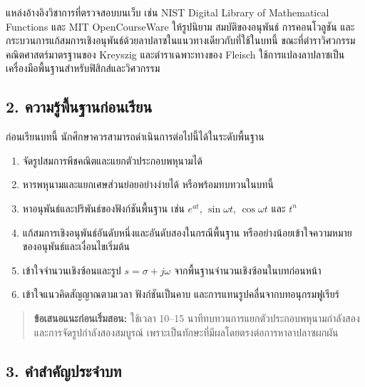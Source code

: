 แหล่งอ้างอิงวิชาการที่ตรวจสอบบนเว็บ เช่น NIST Digital Library of Mathematical Functions และ MIT OpenCourseWare ให้รูปนิยาม สมบัติของอนุพันธ์ การคอนโวลูชัน และกระบวนการแก้สมการเชิงอนุพันธ์ด้วยลาปลาซในแนวทางเดียวกับที่ใช้ในบทนี้ ขณะที่ตำราวิศวกรรมคณิตศาสตร์มาตรฐานของ Kreyszig และตำราเฉพาะทางของ Fleisch ใช้การแปลงลาปลาซเป็นเครื่องมือพื้นฐานสำหรับฟิสิกส์และวิศวกรรม



\subsection{2. ความรู้พื้นฐานก่อนเรียน}

ก่อนเรียนบทนี้ นักศึกษาควรสามารถดำเนินการต่อไปนี้ได้ในระดับพื้นฐาน

\begin{enumerate}
    \item จัดรูปสมการพีชคณิตและแยกตัวประกอบพหุนามได้
    \item หารพหุนามและแยกเศษส่วนย่อยอย่างง่ายได้ หรือพร้อมทบทวนในบทนี้
    \item หาอนุพันธ์และปริพันธ์ของฟังก์ชันพื้นฐาน เช่น $e^{at}$, $\sin \omega t$, $\cos \omega t$ และ $t^n$
    \item แก้สมการเชิงอนุพันธ์อันดับหนึ่งและอันดับสองในกรณีพื้นฐาน หรืออย่างน้อยเข้าใจความหมายของอนุพันธ์และเงื่อนไขเริ่มต้น
    \item เข้าใจจำนวนเชิงซ้อนและรูป $s=\sigma+j\omega$ จากพื้นฐานจำนวนเชิงซ้อนในบทก่อนหน้า
    \item เข้าใจแนวคิดสัญญาณตามเวลา ฟังก์ชันเป็นคาบ และการแทนรูปคลื่นจากบทอนุกรมฟูเรียร์
\end{enumerate}

\begin{quote}
\textbf{ข้อเสนอแนะก่อนเริ่มสอน:} ใช้เวลา 10–15 นาทีทบทวนการแยกตัวประกอบพหุนามกำลังสองและการจัดรูปกำลังสองสมบูรณ์ เพราะเป็นทักษะที่มีผลโดยตรงต่อการหาลาปลาซผกผัน
\end{quote}



\subsection{3. คำสำคัญประจำบท}

